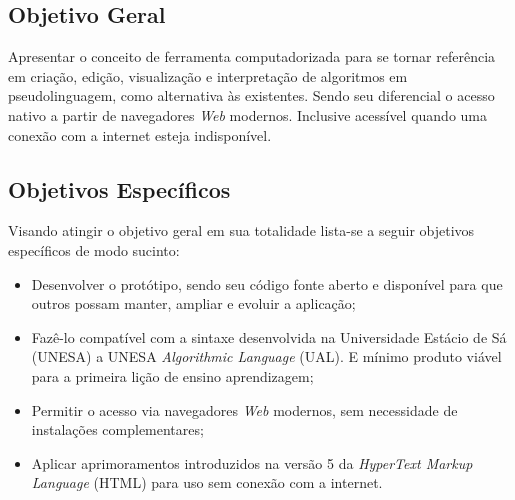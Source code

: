 \ifdraft{\color{green}}{}\subsection{Objetivo Geral}

Apresentar o conceito de ferramenta computadorizada para se tornar referência
em criação, edição, visualização e interpretação de algoritmos em
pseudolinguagem, como alternativa às existentes. Sendo seu diferencial o acesso
nativo a partir de navegadores \textit{Web} modernos. Inclusive acessível
quando uma conexão com a internet esteja indisponível.

\subsection{Objetivos Específicos}

Visando atingir o objetivo geral em sua totalidade lista-se a seguir objetivos
específicos de modo sucinto:

\begin{itemize}
\setlength\itemsep{0em}

\item Desenvolver o protótipo, sendo seu código fonte aberto e
disponível para que outros possam manter, ampliar e evoluir a aplicação;

\item Fazê-lo compatível com a sintaxe desenvolvida na Universidade Estácio
de Sá (UNESA) a UNESA \textit{Algorithmic Language} (UAL). E mínimo produto
viável para a primeira lição de ensino aprendizagem;

\item Permitir o acesso via navegadores \textit{Web} modernos, sem
necessidade de instalações complementares;


\item Aplicar aprimoramentos introduzidos na versão 5 da
\textit{HyperText Markup Language} (HTML) para uso sem conexão com a
internet.

\end{itemize}\color{black}
